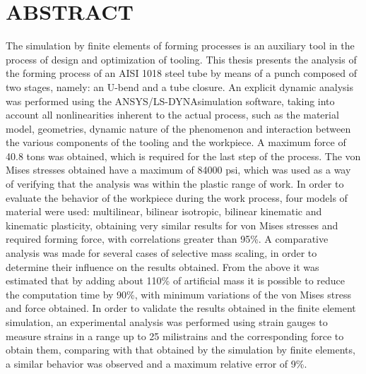 \chapter*{ABSTRACT}

The simulation by finite elements of forming processes is an auxiliary tool in the process of design and optimization of tooling. This thesis presents the analysis of the forming process of an AISI 1018 steel tube by means of a punch composed of two stages, namely: an U-bend and a tube closure. An explicit dynamic analysis was performed using the ANSYS/LS-DYNA\CR simulation software, taking into account all nonlinearities inherent to the actual process, such as the material model, geometries, dynamic nature of the phenomenon and interaction between the various components of the tooling and the workpiece. A maximum force of 40.8 tons was obtained, which is required for the last step of the process. The von Mises stresses obtained have a maximum of 84000 psi, which was used as a way of verifying that the analysis was within the plastic range of work. In order to evaluate the behavior of the workpiece during the work process, four models of material were used: multilinear, bilinear isotropic, bilinear kinematic and kinematic plasticity, obtaining very similar results for von Mises stresses and required forming force, with correlations greater than 95\%. A comparative analysis was made for several cases of selective mass scaling, in order to determine their influence on the results obtained. From the above it was estimated that by adding about 110\% of artificial mass it is possible to reduce the computation time by 90\%, with minimum variations of the von Mises stress and force obtained. In order to validate the results obtained in the finite element simulation, an experimental analysis was performed using strain gauges to measure strains in a range up to 25 milistrains and the corresponding force to obtain them, comparing with that obtained by the simulation by finite elements, a similar behavior was observed and a maximum relative error of 9\%.